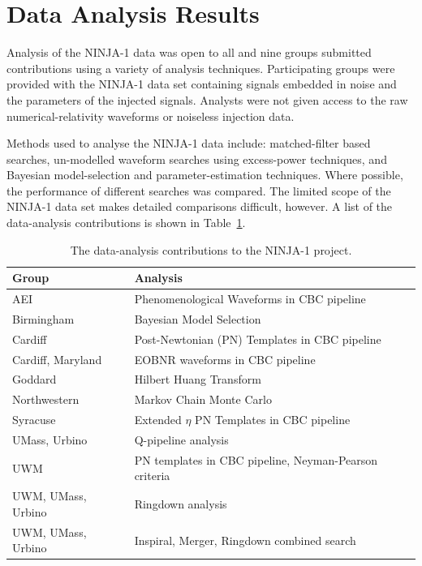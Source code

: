 \section{Data Analysis Results}
\label{sec:ninja1_da}

Analysis of the NINJA-1 data was open to all and nine groups submitted
contributions using a variety of analysis techniques.  Participating
groups were provided with the NINJA-1 data set containing signals
embedded in noise and the parameters of the injected signals.
Analysts were not given access to the raw numerical-relativity
waveforms or noiseless injection data.

Methods used to analyse the NINJA-1 data include: matched-filter based
searches, un-modelled waveform searches using excess-power techniques,
and Bayesian model-selection and parameter-estimation techniques.
Where possible, the performance of different searches was compared.
The limited scope of the NINJA-1 data set makes detailed comparisons
difficult, however. 
A list of the data-analysis contributions is shown in
Table~\ref{tab:ninja1_allda}. 
%
\begin{table}
\begin{center}
\begin{tabular}{|l|l|}\hline
Group & Analysis \\\hline
AEI & Phenomenological Waveforms in CBC pipeline \\
Birmingham & Bayesian Model Selection \\
Cardiff & Post-Newtonian (PN) Templates in CBC pipeline \\
Cardiff, Maryland & EOBNR waveforms in CBC pipeline \\
Goddard & Hilbert Huang Transform \\
Northwestern & Markov Chain Monte Carlo \\ 
Syracuse & Extended $\eta$ PN Templates in CBC pipeline \\
UMass, Urbino & Q-pipeline analysis \\
UWM & PN templates in CBC pipeline, Neyman-Pearson criteria \\
UWM, UMass, Urbino & Ringdown analysis \\
UWM, UMass, Urbino & Inspiral, Merger, Ringdown combined search  \\
\hline
\end{tabular}
\end{center}
\caption[The data-analysis contributions to the NINJA-1 project.]{
\label{tab:ninja1_allda}
The data-analysis contributions to the NINJA-1 project.}
\end{table}

